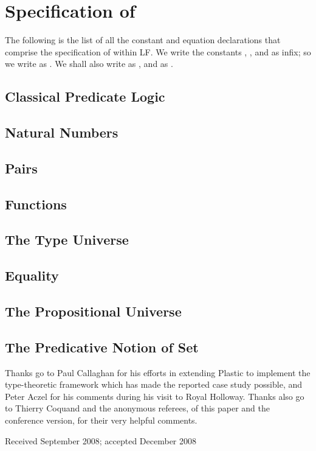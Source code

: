 \documentclass[acmtocl]{acmtrans2m}
\newcommand{\LF}{LF}
\begin{document}
 \section{Specification of }
\label{appendix:lttw}

The following is the list of all the constant and equation
declarations that comprise the specification of  within \LF.
We write the constants , ,  and
 as infix; so we write  as
.  We shall also write  as
, and  as .

\subsection{Classical Predicate Logic}




\subsection{Natural Numbers}

\subsection{Pairs}

\subsection{Functions}

\subsection{The Type Universe}

\subsection{Equality}

\subsection{The Propositional Universe}

\subsection{The Predicative Notion of Set}



\begin{acks}
Thanks go to Paul Callaghan for his efforts in extending Plastic to
implement the type-theoretic framework which has made the reported
case study possible, and Peter Aczel for his comments during his
visit to Royal Holloway. Thanks also go to Thierry Coquand and the
anonymous referees, of this paper and the conference version, for
their very helpful comments.
\end{acks}


\begin{received}
Received September 2008;
accepted December 2008
\end{received}
\end{document}
